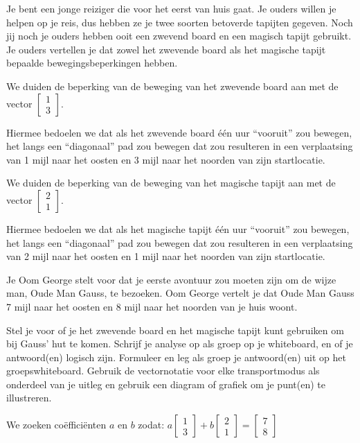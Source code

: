 \documentclass{ximera}
\begin{document}
\author{Alexander Holvoet}

\begin{problem}
Je bent een jonge reiziger die voor het eerst van huis gaat. Je ouders willen je helpen op je reis, dus hebben ze je twee soorten betoverde tapijten gegeven. Noch jij noch je ouders hebben ooit een zwevend board en een magisch tapijt gebruikt. Je ouders vertellen je dat zowel het zwevende board als het magische tapijt bepaalde bewegingsbeperkingen hebben.

We duiden de beperking van de beweging van het zwevende board aan met de vector $\begin{bmatrix} 1 \\ 3 \end{bmatrix}$.

Hiermee bedoelen we dat als het zwevende board één uur ``vooruit'' zou bewegen, het langs een ``diagonaal'' pad zou bewegen dat zou resulteren in een verplaatsing van 1 mijl naar het oosten en 3 mijl naar het noorden van zijn startlocatie.

We duiden de beperking van de beweging van het magische tapijt aan met de vector $\begin{bmatrix} 2 \\ 1 \end{bmatrix}$.

Hiermee bedoelen we dat als het magische tapijt één uur ``vooruit'' zou bewegen, het langs een ``diagonaal'' pad zou bewegen dat zou resulteren in een verplaatsing van 2 mijl naar het oosten en 1 mijl naar het noorden van zijn startlocatie.

Je Oom George stelt voor dat je eerste avontuur zou moeten zijn om de wijze man, Oude Man Gauss, te bezoeken. Oom George vertelt je dat Oude Man Gauss 7 mijl naar het oosten en 8 mijl naar het noorden van je huis woont.

Stel je voor of je het zwevende board en het magische tapijt kunt gebruiken om bij Gauss' hut te komen. Schrijf je analyse op als groep op je whiteboard, en of je antwoord(en) logisch zijn. Formuleer en leg als groep je antwoord(en) uit op het groepswhiteboard. Gebruik de vectornotatie voor elke transportmodus als onderdeel van je uitleg en gebruik een diagram of grafiek om je punt(en) te illustreren.

\begin{freeResponse}
We zoeken coëfficiënten $a$ en $b$ zodat: $a\begin{bmatrix} 1 \\ 3 \end{bmatrix} + b\begin{bmatrix} 2 \\ 1 \end{bmatrix} = \begin{bmatrix} 7 \\ 8 \end{bmatrix}$


\end{freeResponse}
\end{problem}
\end{document}
